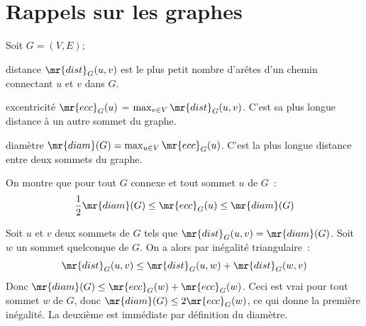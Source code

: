 \section{Rappels sur les graphes}

Soit $G = (V,E)$;

\begin{definition}{}{distance}
$\mr{dist}_G(u,v)$ est le plus petit nombre d'arêtes d'un chemin connectant $u$ et $v$ dans $G$.
\end{definition}

\begin{definition}{}{excentricité}
$\mr{ecc}_G(u)$ = $\max_{v \in V} \mr{dist}_G(u,v)$. C'est sa plus longue distance à un autre sommet du graphe.
\end{definition}

\begin{definition}{}{diamètre}
$\mr{diam}(G) = \max_{u \in V} \mr{ecc}_G(u)$. C'est la plus longue distance entre deux sommets du graphe.
\end{definition}

\begin{exercice}{}{}
On montre que pour tout $G$ connexe et tout sommet $u$ de $G$~:
$$\frac{1}{2} \mr{diam}(G) \leq \mr{ecc}_G(u) \leq \mr{diam}(G)$$

Soit $u$ et $v$ deux sommets de $G$ tels que $\mr{dist}_G(u,v) = \mr{diam}(G)$. Soit $w$ un sommet quelconque de $G$. On a alors par inégalité triangulaire~:
$$\mr{dist}_G(u,v) \leq \mr{dist}_G(u,w) + \mr{dist}_G(w,v)$$
Donc $\mr{diam}(G) \leq \mr{ecc}_G(w) + \mr{ecc}_G(w)$.
Ceci est vrai pour tout sommet $w$ de $G$, donc $\mr{diam}(G) \leq 2 \mr{ecc}_G(w)$, ce qui donne la première inégalité. La deuxième est immédiate par définition du diamètre.
\end{exercice}

